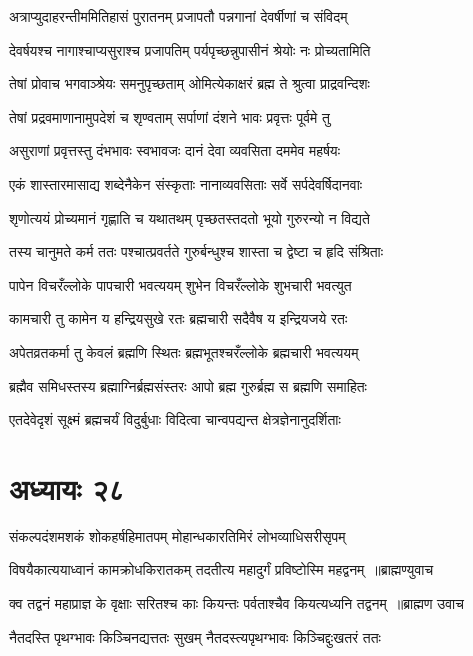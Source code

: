 \twolineshloka
{अत्राप्युदाहरन्तीममितिहासं पुरातनम्}
{प्रजापतौ पन्नगानां देवर्षीणां च संविदम्}


\twolineshloka
{देवर्षयश्च नागाश्चाप्यसुराश्च प्रजापतिम्}
{पर्यपृच्छन्नुपासीनं श्रेयोः नः प्रोच्यतामिति}


\twolineshloka
{तेषां प्रोवाच भगवाञ्श्रेयः समनुपृच्छताम्}
{ओमित्येकाक्षरं ब्रह्म ते श्रुत्वा प्राद्रवन्दिशः}


\twolineshloka
{तेषां प्रद्रवमाणानामुपदेशं च शृण्वताम्}
{सर्पाणां दंशने भावः प्रवृत्तः पूर्वमे तु}


\twolineshloka
{असुराणां प्रवृत्तस्तु दंभभावः स्वभावजः}
{दानं देवा व्यवसिता दममेव महर्षयः}


\twolineshloka
{एकं शास्तारमासाद्य शब्देनैकेन संस्कृताः}
{नानाव्यवसिताः सर्वे सर्पदेवर्षिदानवाः}


\twolineshloka
{शृणोत्ययं प्रोच्यमानं गृह्णाति च यथातथम्}
{पृच्छतस्तदतो भूयो गुरुरन्यो न विद्यते}


\twolineshloka
{तस्य चानुमते कर्म ततः पश्चात्प्रवर्तते}
{गुरुर्बन्धुश्च शास्ता च द्वेष्टा च हृदि संश्रिताः}


\twolineshloka
{पापेन विचरँल्लोके पापचारी भवत्ययम्}
{शुभेन विचरँल्लोके शुभचारी भवत्युत}


\twolineshloka
{कामचारी तु कामेन य हन्द्रियसुखे रतः}
{ब्रह्मचारी सदैवैष य इन्द्रियजये रतः}


\twolineshloka
{अपेतव्रतकर्मा तु केवलं ब्रह्मणि स्थितः}
{ब्रह्मभूतश्चरँल्लोके ब्रह्मचारी भवत्ययम्}


\twolineshloka
{ब्रह्मैव समिधस्तस्य ब्रह्माग्निर्ब्रह्मसंस्तरः}
{आपो ब्रह्म गुरुर्ब्रह्म स ब्रह्मणि समाहितः}


\twolineshloka
{एतदेवेदृशं सूक्ष्मं ब्रह्मचर्यं विदुर्बुधाः}
{विदित्वा चान्वपद्यन्त क्षेत्रज्ञेनानुदर्शिताः}


\chapter{अध्यायः २८}
\twolineshloka
{संकल्पदंशमशकं शोकहर्षहिमातपम्}
{मोहान्धकारतिमिरं लोभव्याधिसरीसृपम्}


\threelineshloka
{विषयैकात्ययाध्वानं कामक्रोधकिरातकम्}
{तदतीत्य महादुर्गं प्रविष्टोस्मि महद्वनम् ॥ब्राह्मण्युवाच}
{}


\threelineshloka
{क्व तद्वनं महाप्राज्ञ के वृक्षाः सरितश्च काः}
{कियन्तः पर्वताश्चैव कियत्यध्यनि तद्वनम् ॥ब्राह्मण उवाच}
{}


\twolineshloka
{नैतदस्ति पृथग्भावः किञ्चिनद्यत्ततः सुखम्}
{नैतदस्त्यपृथग्भावः किञ्चिद्दुःखतरं ततः}



